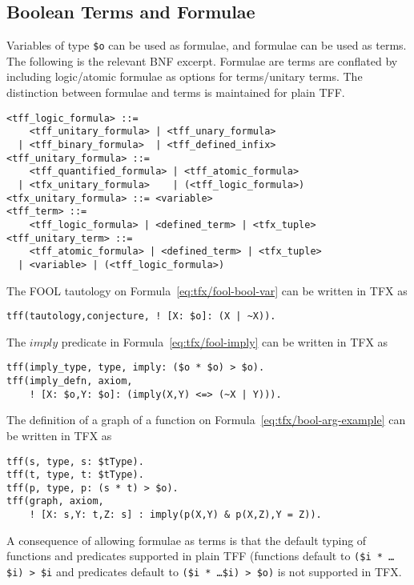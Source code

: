 \subsection{Boolean Terms and Formulae}

Variables of type {\tt \$o} can be used as formulae, and formulae can be 
used as terms. 
The following is the relevant BNF excerpt.
Formulae are terms are conflated by including logic/atomic formulae as
options for terms/unitary terms.
The distinction between formulae and terms is maintained for plain TFF.
\begin{verbatim}
<tff_logic_formula> ::=
    <tff_unitary_formula> | <tff_unary_formula>
  | <tff_binary_formula>  | <tff_defined_infix>
<tff_unitary_formula> ::=
    <tff_quantified_formula> | <tff_atomic_formula>
  | <tfx_unitary_formula>    | (<tff_logic_formula>)
<tfx_unitary_formula> ::= <variable>
<tff_term> ::=
    <tff_logic_formula> | <defined_term> | <tfx_tuple>
<tff_unitary_term> ::=
    <tff_atomic_formula> | <defined_term> | <tfx_tuple>
  | <variable> | (<tff_logic_formula>)
\end{verbatim}

The FOOL tautology on Formula~\ref{eq:tfx/fool-bool-var} can be written in TFX as
\begin{verbatim}
tff(tautology,conjecture, ! [X: $o]: (X | ~X)).
\end{verbatim}

The $\mathit{imply}$ predicate in Formula~\ref{eq:tfx/fool-imply} can 
be written in TFX as
\begin{verbatim}
tff(imply_type, type, imply: ($o * $o) > $o).
tff(imply_defn, axiom,
    ! [X: $o,Y: $o]: (imply(X,Y) <=> (~X | Y))).
\end{verbatim}


The definition of a graph of a function on Formula~\ref{eq:tfx/bool-arg-example} can be written in TFX as
\begin{verbatim}
tff(s, type, s: $tType).
tff(t, type, t: $tType).
tff(p, type, p: (s * t) > $o).
tff(graph, axiom,
    ! [X: s,Y: t,Z: s] : imply(p(X,Y) & p(X,Z),Y = Z)).
\end{verbatim}

A consequence of allowing formulae as terms is that the default typing of 
functions and predicates supported in plain TFF (functions default to 
{\tt (\$i * \ldots * \$i) > \$i} and predicates default to 
{\tt (\$i * \ldots * \$i) > \$o)} is not supported in TFX.

